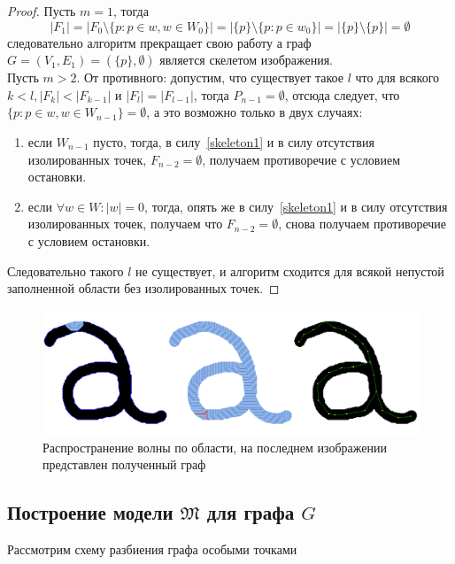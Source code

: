 \begin{proof}
Пусть $m=1$, тогда 
$$|F_1|=|F_0\setminus\{p:p\in w, w\in W_0\}| = |\{p\}\setminus\{p:p\in w_0\}|=|\{p\}\setminus\{p\}|=\emptyset$$
следовательно алгоритм прекращает свою работу а граф $G=(V_1,E_1)=(\{p\},\emptyset)$ является скелетом изображения.\\Пусть $m>2$. От противного: допустим, что существует такое $l$ что для всякого $k<l,|F_{k}| < |F_{k-1}|$ и $|F_{l}|=|F_{l-1}|$, тогда $P_{n-1}=\emptyset$, отсюда следует, что $\{p : p\in w, w \in W_{n-1}\}=\emptyset$, а это возможно только в двух случаях:\\
\begin{enumerate}
\item если $W_{n-1}$ пусто, тогда, в силу~\ref{skeleton1} и в силу отсутствия изолированных точек, $F_{n-2}=\emptyset$, получаем противоречие с условием остановки.\\
\item если $\forall w\in W:|w|=0$, тогда, опять же в силу~\ref{skeleton1} и в силу отсутствия изолированных точек, получаем что $F_{n-2}=\emptyset$, снова получаем противоречие с условием остановки.\\
\end{enumerate}
Следовательно такого $l$ не существует, и алгоритм сходится для всякой непустой заполненной области без изолированных точек.
\end{proof}
\begin{figure}[h]
\centering
\includegraphics[width=\linewidth,keepaspectratio]{images/th_wave_graph}
\caption{Распространение волны по области, на последнем изображении представлен полученный граф}
\end{figure}

\subsection{Построение модели  $\mathfrak{M}$ для графа $G$}
Рассмотрим схему разбиения графа особыми точками


